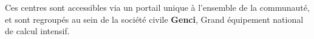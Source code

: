 Ces centres sont accessibles via un portail unique \`a l'ensemble de la communaut\'e,
et sont regroup\'es au sein de la soci\'et\'e civile {\bf Genci}, Grand \'equipement national de calcul intensif.


